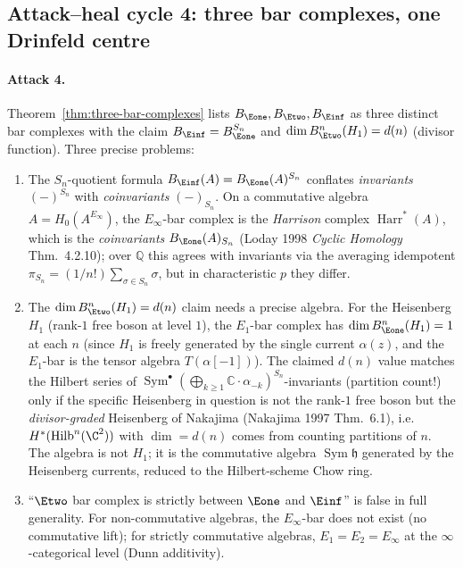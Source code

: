 \subsection*{Attack--heal cycle 4: three bar complexes, one
Drinfeld centre}

\paragraph{Attack 4.}  Theorem~\ref{thm:three-bar-complexes} lists
$B_{\Eone}, B_{\Etwo}, B_{\Einf}$ as three distinct bar complexes
with the claim $B_{\Einf} = B_{\Eone}^{S_n}$ and
$\dim B_{\Etwo}^n(H_1) = d(n)$ (divisor function).  Three precise
problems:
\begin{enumerate}[label=\textup{(\roman*)}]
\item The $S_n$-quotient formula $B_{\Einf}(A) = B_{\Eone}(A)^{S_n}$
conflates \emph{invariants} $(-)^{S_n}$ with \emph{coinvariants}
$(-)_{S_n}$.  On a commutative algebra $A = H_0(A^{E_\infty})$, the
$E_\infty$-bar complex is the \emph{Harrison} complex
$\operatorname{Harr}^*(A)$, which is the \emph{coinvariants}
$B_{\Eone}(A)_{S_n}$ (Loday 1998 \emph{Cyclic Homology} Thm.~4.2.10);
over $\mathbb Q$ this agrees with invariants via the averaging
idempotent $\pi_{S_n} = (1/n!)\sum_{\sigma\in S_n}\sigma$, but in
characteristic $p$ they differ.
\item The $\dim B_{\Etwo}^n(H_1) = d(n)$ claim needs a precise
algebra.  For the Heisenberg $H_1$ (rank-$1$ free boson at
level $1$), the $E_1$-bar complex has
$\dim B_{\Eone}^n(H_1) = 1$ at each $n$ (since $H_1$ is freely
generated by the single current $\alpha(z)$, and the $E_1$-bar is
the tensor algebra $T(\alpha[-1])$).  The claimed $d(n)$ value
matches the Hilbert series of $\operatorname{Sym}^\bullet
(\bigoplus_{k\geq 1}\mathbb C\cdot\alpha_{-k})^{S_n}$-invariants
(partition count!) only if the specific Heisenberg in question is
not the rank-$1$ free boson but the \emph{divisor-graded} Heisenberg
of Nakajima (Nakajima 1997 Thm.~6.1), i.e.\ $H^*(\mathrm{Hilb}^n(\C^2))$ with
$\dim = d(n)$ comes from counting partitions of $n$.  The algebra
is not $H_1$; it is the commutative algebra $\operatorname{Sym}\mathfrak h$
generated by the Heisenberg currents, reduced to the Hilbert-scheme
Chow ring.
\item ``$\Etwo$ bar complex is strictly between $\Eone$ and
$\Einf$'' is false in full generality.  For non-commutative
algebras, the $E_\infty$-bar does not exist (no commutative lift);
for strictly commutative algebras, $E_1 = E_2 = E_\infty$ at the
$\infty$-categorical level (Dunn additivity).
\end{enumerate}


